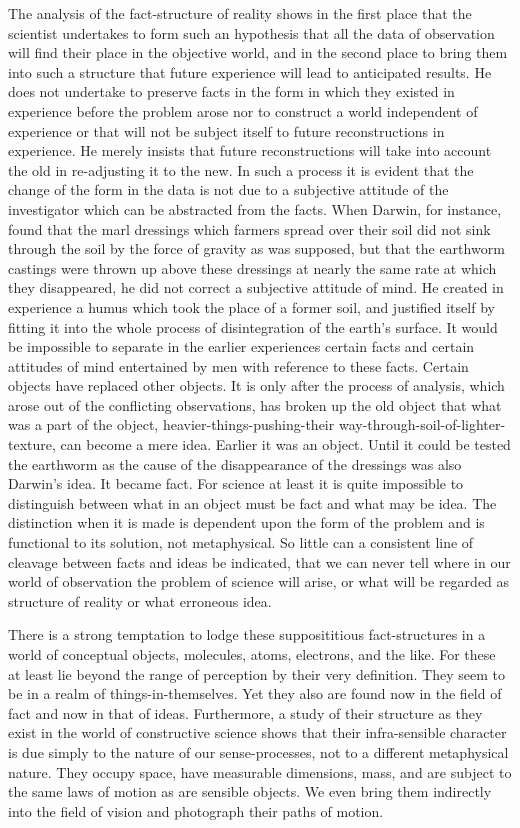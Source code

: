 \documentclass[12pt]{article}
\begin{document}
The analysis of the fact-structure of reality shows
in the first place that the scientist undertakes to form
such an hypothesis that all the data of observation
will find their place in the objective world, and in the
second place to bring them into such a structure that
future experience will lead to anticipated results. He
does not undertake to preserve facts in the form in
which they existed in experience before the problem
arose nor to construct a world independent of experience
or that will not be subject itself to future reconstructions
in experience. He merely insists that future
reconstructions will take into account the old in re-adjusting
it to the new. In such a process it is evident
that the change of the form in the data is not due to
a subjective attitude of the investigator which can be
abstracted from the facts. When Darwin, for instance,
found that the marl dressings which farmers
spread over their soil did not sink through the soil
by the force of gravity as was supposed, but that the
earthworm castings were thrown up above these dressings
at nearly the same rate at which they disappeared,
he did not correct a subjective attitude of mind. He
created in experience a humus which took the place
of a former soil, and justified itself by fitting it into
the whole process of disintegration of the earth's surface.
It would be impossible to separate in the earlier
experiences certain facts and certain attitudes of mind
entertained by men with reference to these facts. Certain
objects have replaced other objects. It is only after
the process of analysis, which arose out of the conflicting
observations, has broken up the old object that what
was a part of the object, heavier-things-pushing-their
way-through-soil-of-lighter-texture, can become a mere
idea. Earlier it was an object. Until it could be
tested the earthworm as the cause of the disappearance
of the dressings was also Darwin's idea. It became fact.
For science at least it is quite impossible to distinguish
between what in an object must be fact and what may
be idea. The distinction when it is made is dependent
upon the form of the problem and is functional to its
solution, not metaphysical. So little can a consistent
line of cleavage between facts and ideas be indicated,
that we can never tell where in our world of observation
the problem of science will arise, or what will be regarded
as structure of reality or what erroneous
idea.


There is a strong temptation to lodge these supposititious
fact-structures in a world of conceptual objects,
molecules, atoms, electrons, and the like. For these at
least lie beyond the range of perception by their very
definition. They seem to be in a realm of things-in-themselves.
Yet they also are found now in the field
of fact and now in that of ideas. Furthermore, a study
of their structure as they exist in the world of constructive
science shows that their infra-sensible character
is due simply to the nature of our sense-processes,
not to a different metaphysical nature. They occupy
space, have measurable dimensions, mass, and are subject
to the same laws of motion as are sensible objects.
We even bring them indirectly into the field of vision
and photograph their paths of motion.
\end{document}
